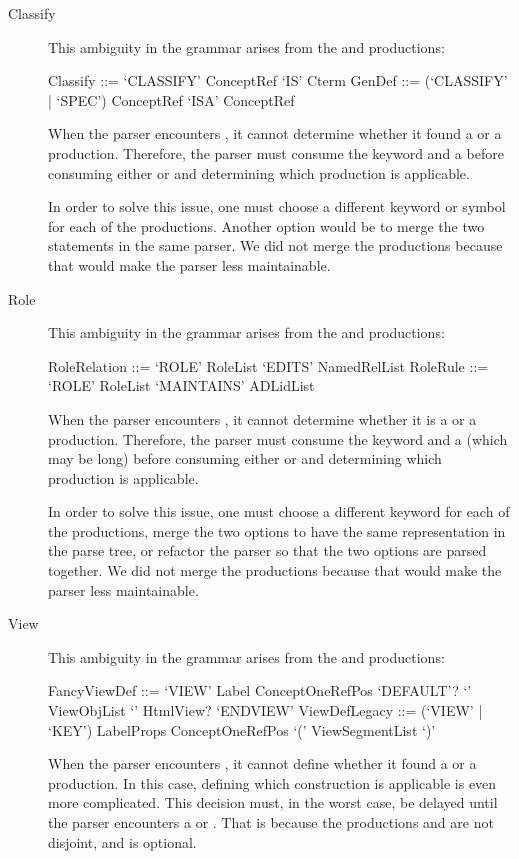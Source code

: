 \begin{description}
  \item[Classify]
    This ambiguity in the grammar arises from the  and  productions:
    \begin{ebnf}
     Classify ::= `CLASSIFY' ConceptRef `IS' Cterm
     GenDef ::= (`CLASSIFY' | `SPEC') ConceptRef `ISA' ConceptRef\end{ebnf}
    When the parser encounters , it cannot determine whether it found a  or a  production.
    Therefore, the parser must consume the keyword and a  before consuming either  or  and determining which production is applicable.
    
    In order to solve this issue, one must choose a different keyword or symbol for each of the productions.
    Another option would be to merge the two statements in the same parser.
    We did not merge the productions because that would make the parser less maintainable.
  
  \item[Role]
    This ambiguity in the grammar arises from the  and  productions:
    \begin{ebnf}
     RoleRelation ::= `ROLE' RoleList `EDITS' NamedRelList
     RoleRule ::= `ROLE' RoleList `MAINTAINS' ADLidList\end{ebnf}
    When the parser encounters , it cannot determine whether it is a  or a  production.
    Therefore, the parser must consume the keyword and a  (which may be long) before consuming either  or  and determining which production is applicable.
    
    In order to solve this issue, one must choose a different keyword for each of the productions, merge the two options to have the same representation in the parse tree, or refactor the parser so that the two options are parsed together.
    We did not merge the productions because that would make the parser less maintainable.
  
  \item[View]
    This ambiguity in the grammar arises from the  and  productions:
    \begin{ebnf}
     FancyViewDef ::= `VIEW' Label ConceptOneRefPos `DEFAULT'? `{' ViewObjList `}' HtmlView? `ENDVIEW'
     ViewDefLegacy ::= (`VIEW' | `KEY') LabelProps ConceptOneRefPos `(' ViewSegmentList `)'\end{ebnf}
    When the parser encounters , it cannot define whether it found a  or a  production.
    In this case, defining which construction is applicable is even more complicated.
    This decision must, in the worst case, be delayed until the parser encounters a  or .
    That is because the productions  and  are not disjoint, and  is optional.
    

\end{description}
